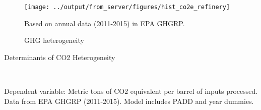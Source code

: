 \documentclass[12pt]{article}
\begin{document}
\begin{figure}[H]
\centering
\caption{GHG heterogeneity \label{fig:ghg_histogram}}
\texttt{[image: ../output/from\_server/figures/hist\_co2e\_refinery]} \\
\vspace{4pt}
\begin{minipage}{.6\linewidth}
\scriptsize
Based on annual data (2011-2015) in EPA GHGRP.
\end{minipage}
\end{figure}

\begin{table}[H]
\centering
\caption{Determinants of CO2 Heterogeneity \label{tab:co2_reg}}
 \\
\vspace{4pt}
\begin{minipage}{.6\linewidth}
\scriptsize
Dependent variable: Metric tons of CO2 equivalent per barrel of inputs processed. Data from EPA GHGRP (2011-2015). Model includes PADD and year dummies.
\end{minipage}
\end{table}

\clearpage


\end{document}
